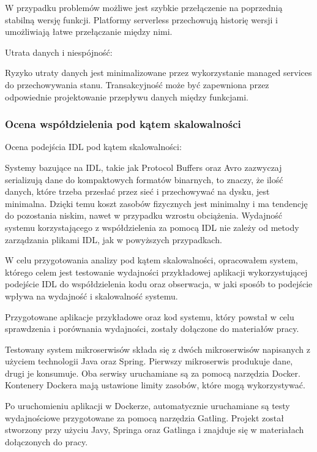 \documentclass[runningheads,12pt]{llncs}
\begin{document}
W przypadku problemów możliwe jest szybkie przełączenie na poprzednią stabilną wersję funkcji. Platformy serverless przechowują historię wersji i umożliwiają łatwe przełączanie między nimi. ~\cite[p. 289]{roberts2018cloud}

Utrata danych i niespójność: 

Ryzyko utraty danych jest minimalizowane przez wykorzystanie managed services do przechowywania stanu. Transakcyjność może być zapewniona przez odpowiednie projektowanie przepływu danych między funkcjami. ~\cite[p. 312]{roberts2018cloud}

\newpage
\subsubsection{Ocena współdzielenia pod kątem skalowalności}

Ocena podejścia IDL pod kątem skalowalności:

Systemy bazujące na IDL, takie jak Protocol Buffers oraz Avro zazwyczaj serializują dane do kompaktowych formatów binarnych, to znaczy, że ilość danych, które trzeba przesłać przez sieć i przechowywać na dysku, jest minimalna. Dzięki temu koszt zasobów fizycznych jest minimalny i ma tendencję do pozostania niskim, nawet w przypadku wzrostu obciążenia. Wydajność systemu korzystającego z współdzielenia za pomocą IDL nie zależy od metody zarządzania plikami IDL, jak w powyższych przypadkach.

W celu przygotowania analizy pod kątem skalowalności, opracowałem system, którego celem jest testowanie wydajności przykładowej aplikacji wykorzystującej podejście IDL do współdzielenia kodu oraz obserwacja, w jaki sposób to podejście wpływa na wydajność i skalowalność systemu.

Przygotowane aplikacje przykładowe oraz kod systemu, który powstał w celu sprawdzenia i porównania wydajności, zostały dołączone do materiałów pracy.

Testowany system mikroserwisów składa się z dwóch mikroserwisów napisanych z użyciem technologii Java oraz Spring. Pierwszy mikroserwis produkuje dane, drugi je konsumuje. Oba serwisy uruchamiane są za pomocą narzędzia Docker. Kontenery Dockera mają ustawione limity zasobów, które mogą wykorzystywać.

Po uruchomieniu aplikacji w Dockerze, automatycznie uruchamiane są testy wydajnościowe przygotowane za pomocą narzędzia Gatling. Projekt został stworzony przy użyciu Javy, Springa oraz Gatlinga i znajduje się w materiałach dołączonych do pracy.
\end{document}
